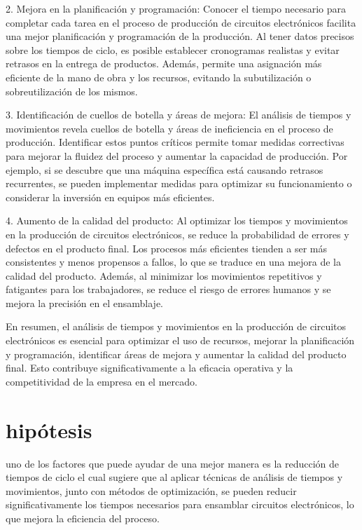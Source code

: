     2. Mejora en la planificación y programación: Conocer el tiempo necesario para completar cada tarea en el proceso de producción de circuitos electrónicos facilita una mejor planificación y programación de la producción. Al tener datos precisos sobre los tiempos de ciclo, es posible establecer cronogramas realistas y evitar retrasos en la entrega de productos. Además, permite una asignación más eficiente de la mano de obra y los recursos, evitando la subutilización o sobreutilización de los mismos. \newline
    
    3. Identificación de cuellos de botella y áreas de mejora: El análisis de tiempos y movimientos revela cuellos de botella y áreas de ineficiencia en el proceso de producción. Identificar estos puntos críticos permite tomar medidas correctivas para mejorar la fluidez del proceso y aumentar la capacidad de producción. Por ejemplo, si se descubre que una máquina específica está causando retrasos recurrentes, se pueden implementar medidas para optimizar su funcionamiento o considerar la inversión en equipos más eficientes.\newline
    
    4. Aumento de la calidad del producto: Al optimizar los tiempos y movimientos en la producción de circuitos electrónicos, se reduce la probabilidad de errores y defectos en el producto final. Los procesos más eficientes tienden a ser más consistentes y menos propensos a fallos, lo que se traduce en una mejora de la calidad del producto. Además, al minimizar los movimientos repetitivos y fatigantes para los trabajadores, se reduce el riesgo de errores humanos y se mejora la precisión en el ensamblaje. \newline
    
    En resumen, el análisis de tiempos y movimientos en la producción de circuitos electrónicos es esencial para optimizar el uso de recursos, mejorar la planificación y programación, identificar áreas de mejora y aumentar la calidad del producto final. Esto contribuye significativamente a la eficacia operativa y la competitividad de la empresa en el mercado.
    
    \section{  hipótesis }
    
    uno de los factores que puede ayudar de una mejor manera es la reducción de tiempos de ciclo el cual sugiere que al aplicar  técnicas de análisis de tiempos y movimientos, junto con métodos de optimización, se pueden reducir significativamente los tiempos necesarios para ensamblar circuitos electrónicos, lo que mejora la eficiencia del proceso.
    \newline
    
